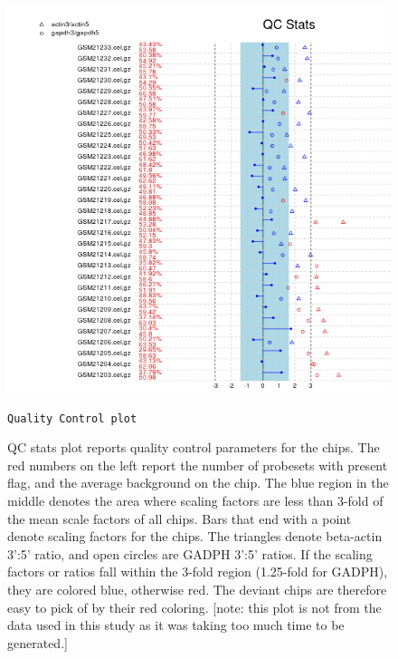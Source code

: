 \documentclass[oneside, a4paper, 11pt]{book}
\begin{document}
\begin{figure}[h]
    \centering
    \includegraphics[scale=0.5]{qcplot.png}
    \caption{\texttt{Quality Control plot}}
    \captionsetup{singlelinecheck=off, font=footnotesize, width=\textwidth}
    \caption*{QC stats plot reports quality control parameters for the chips. The red numbers on the left report the number of probesets with present flag, and the average background on the chip. The blue region in the middle denotes the area where scaling factors are less than 3-fold of the mean scale factors of all chips. Bars that end with a point denote scaling factors for the chips. The triangles denote beta-actin 3’:5’ ratio, and open circles are GADPH 3’:5’ ratios. If the scaling factors or ratios fall within the 3-fold region (1.25-fold for GADPH), they are colored blue, otherwise red. The deviant chips are therefore easy to pick of by their red coloring. [note: this plot is not from the data used in this study as it was taking too much time to be generated.]}
\end{figure}
\end{document}
